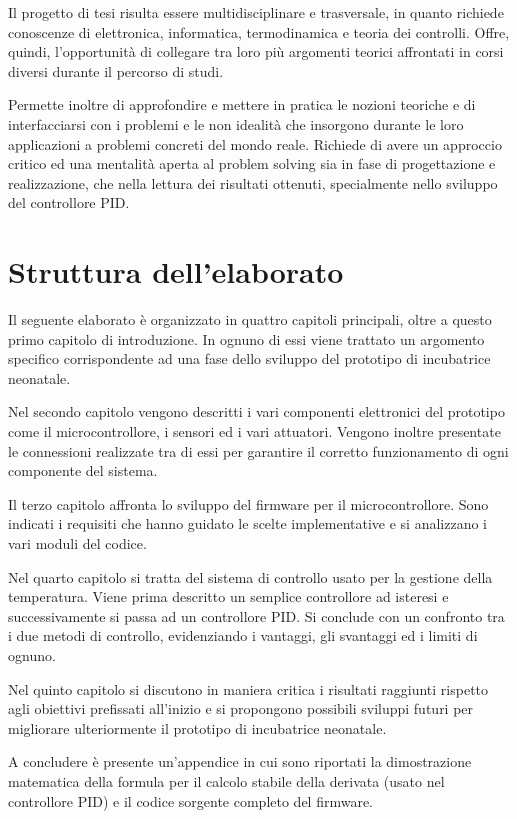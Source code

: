 Il progetto di tesi risulta essere multidisciplinare e trasversale, in quanto richiede conoscenze di elettronica, informatica,
termodinamica e teoria dei controlli. Offre, quindi, l'opportunità di collegare tra loro più argomenti teorici affrontati
in corsi diversi durante il percorso di studi.

Permette inoltre di approfondire e mettere in pratica le nozioni teoriche e di interfacciarsi con i problemi e le non idealità
che insorgono durante le loro applicazioni a problemi concreti del mondo reale. Richiede di avere un approccio critico ed una
mentalità aperta al problem solving sia in fase di progettazione e realizzazione, che nella lettura dei risultati ottenuti,
specialmente nello sviluppo del controllore PID.

\section{Struttura dell'elaborato}
Il seguente elaborato è organizzato in quattro capitoli principali, oltre a questo primo capitolo di introduzione. In ognuno
di essi viene trattato un argomento specifico corrispondente ad una fase dello sviluppo del prototipo di incubatrice neonatale.

Nel secondo capitolo vengono descritti i vari componenti elettronici del prototipo come il microcontrollore, i sensori
ed i vari attuatori. Vengono inoltre presentate le connessioni realizzate tra di essi per garantire il corretto funzionamento
di ogni componente del sistema.

Il terzo capitolo affronta lo sviluppo del firmware per il microcontrollore. Sono indicati i requisiti che hanno guidato le
scelte implementative e si analizzano i vari moduli del codice.

Nel quarto capitolo si tratta del sistema di controllo usato per la gestione della temperatura. Viene prima descritto un
semplice controllore ad isteresi e successivamente si passa ad un controllore PID. Si conclude con un confronto tra i due
metodi di controllo, evidenziando i vantaggi, gli svantaggi ed i limiti di ognuno.

Nel quinto capitolo si discutono in maniera critica i risultati raggiunti rispetto agli obiettivi prefissati all'inizio
e si propongono possibili sviluppi futuri per migliorare ulteriormente il prototipo di incubatrice neonatale.

A concludere è presente un'appendice in cui sono riportati la dimostrazione matematica della formula per il calcolo stabile
della derivata (usato nel controllore PID) e il codice sorgente completo del firmware.

